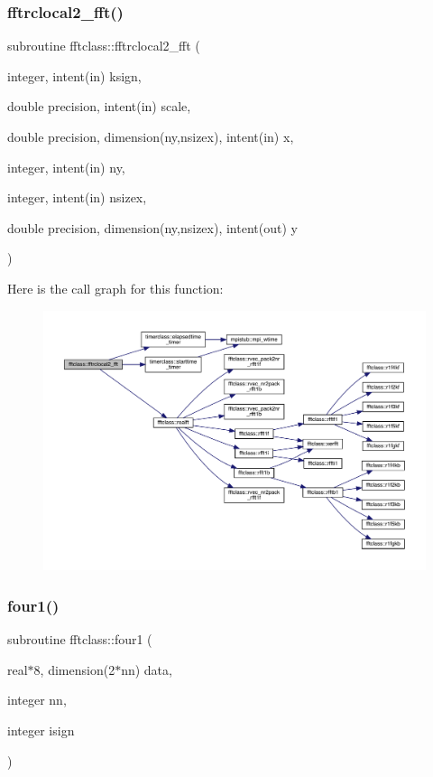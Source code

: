 \subsubsection{\texorpdfstring{fftrclocal2\_fft()}{fftrclocal2\_fft()}}
{\footnotesize\ttfamily subroutine fftclass\+::fftrclocal2\+\_\+fft (\begin{DoxyParamCaption}\item[{integer, intent(in)}]{ksign,  }\item[{double precision, intent(in)}]{scale,  }\item[{double precision, dimension(ny,nsizex), intent(in)}]{x,  }\item[{integer, intent(in)}]{ny,  }\item[{integer, intent(in)}]{nsizex,  }\item[{double precision, dimension(ny,nsizex), intent(out)}]{y }\end{DoxyParamCaption})}

Here is the call graph for this function\+:\nopagebreak
\begin{figure}[H]
\begin{center}
\leavevmode
\includegraphics[width=350pt]{namespacefftclass_a83a1c8ccf853ae07fdfc5a80e1e244d1_cgraph}
\end{center}
\end{figure}
\mbox{\label{namespacefftclass_a4597d420a1363f9fd0b652472d7caf52}} 
\subsubsection{\texorpdfstring{four1()}{four1()}}
{\footnotesize\ttfamily subroutine fftclass\+::four1 (\begin{DoxyParamCaption}\item[{real$\ast$8, dimension(2$\ast$nn)}]{data,  }\item[{integer}]{nn,  }\item[{integer}]{isign }\end{DoxyParamCaption})}



